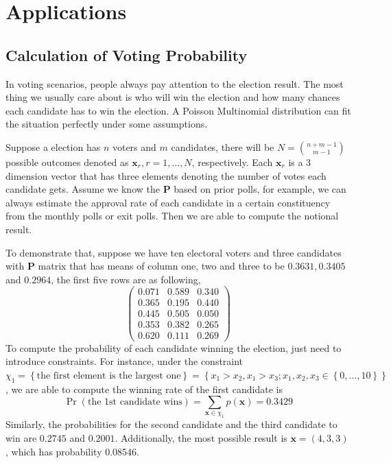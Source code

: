\documentclass[12pt]{article}
\newcommand{\Pmat}{\mathbf{P}}
\newcommand{\xvec}{\boldsymbol{x}}
\begin{document}
\section{Applications}
\subsection{Calculation of Voting Probability}

  In voting scenarios, people always pay attention to the election result. The most thing we usually care about is who will win the election and how many chances each candidate has to win the election. A Poisson Multinomial distribution can fit the situation perfectly under some assumptions.

Suppose a election has $n$ voters and $m$ candidates, there will be $N = \binom{n+m-1}{m-1}$ possible outcomes denoted as $\boldsymbol{x}_r, r = 1, \dots, N$, respectively. Each $\xvec_r$ is a 3 dimension vector that has three elements denoting the number of votes each candidate gets. Assume we know the $\Pmat$ based on prior polls, for example, we can always estimate the approval rate of each candidate in a certain constituency from the monthly polls or exit polls. Then we are able to compute the notional result.

To demonstrate that, suppose we have ten electoral voters and three candidates with $\Pmat$ matrix that has means of column one, two and three to be $0.3631,0.3405$ and $0.2964$, the first five rows are as following,
\begin{equation*}
\begin{pmatrix}
0.071 & 0.589 & 0.340\\
0.365 & 0.195 & 0.440\\
0.445 & 0.505 & 0.050\\
0.353 & 0.382 & 0.265\\
0.620 & 0.111 & 0.269
    \end{pmatrix}
\end{equation*}
To compute the probability of each candidate winning the election, just need to introduce constraints. For instance, under the constraint $\chi_1 = \left\{\text{the first element is the largest one}\right\} = \left\{x_1>x_2, x_1>x_3; x_1, x_2,x_3 \in \left\{0,\dots,10\right\}\right\}$, we are able to compute the winning rate of the first candidate is
\begin{equation*}
\Pr(\text{the 1st candidate wins}) = \sum_{\boldsymbol{x} \in \chi_{1}} p(\boldsymbol{x}) = 0.3429
\end{equation*}
Similarly, the probabilities for the second candidate and the third candidate to win are $0.2745$ and $0.2001$. Additionally, the most possible result is $\boldsymbol{x} = (4,3,3)$, which has probability 0.08546.
\end{document}
